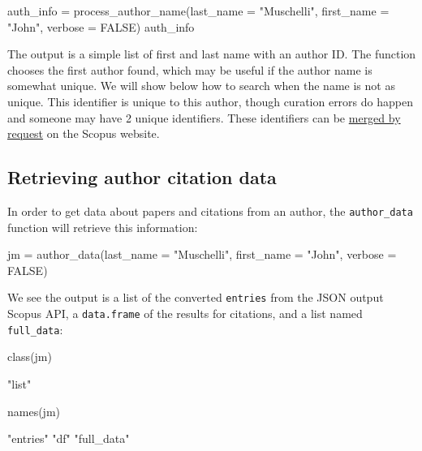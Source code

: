 \begin{Schunk}
\begin{Sinput}
auth_info = process_author_name(last_name = "Muschelli", first_name = "John",
                                verbose = FALSE)
auth_info
\end{Sinput}
\end{Schunk}

The output is a simple list of first and last name with an author ID.
The function chooses the first author found, which may be useful if the
author name is somewhat unique. We will show below how to search when
the name is not as unique. This identifier is unique to this author,
though curation errors do happen and someone may have 2 unique
identifiers. These identifiers can be
\href{https://service.elsevier.com/app/answers/detail/a_id/14550/supporthub/scopuscontent/kw/merge/}{merged
by request} on the Scopus website.

\hypertarget{retrieving-author-citation-data}{%
\subsection{Retrieving author citation
data}\label{retrieving-author-citation-data}}

In order to get data about papers and citations from an author, the
\texttt{author\_data} function will retrieve this information:

\begin{Schunk}
\begin{Sinput}
jm = author_data(last_name = "Muschelli", first_name = "John", verbose = FALSE)
\end{Sinput}
\end{Schunk}

We see the output is a list of the converted \texttt{entries} from the
JSON output Scopus API, a \texttt{data.frame} of the results for
citations, and a list named \texttt{full\_data}:

\begin{Schunk}
\begin{Sinput}
class(jm)
\end{Sinput}
\begin{Soutput}
[1] "list"
\end{Soutput}
\begin{Sinput}
names(jm)
\end{Sinput}
\begin{Soutput}
[1] "entries"   "df"        "full_data"
\end{Soutput}
\end{Schunk}

